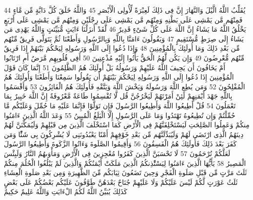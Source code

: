 \documentclass[20pt,a4paper]{article}
\begin{document}
{\tiny\colorbox{cl_aya}{44}} يُقَلِّبُ اللَّهُ الَّيْلَ وَالنَّهَارَ إِنَّ فِى ذَلِكَ لَعِبْرَةً لِّأُولِى الْأَبْصَرِ
{\tiny\colorbox{cl_aya}{45}} وَاللَّهُ خَلَقَ كُلَّ دَابَّةٍ مِّن مَّاءٍ فَمِنْهُم مَّن يَمْشِى عَلَى بَطْنِهِ وَمِنْهُم مَّن يَمْشِى عَلَى رِجْلَيْنِ وَمِنْهُم مَّن يَمْشِى عَلَى أَرْبَعٍ يَخْلُقُ اللَّهُ مَا يَشَاءُ إِنَّ اللَّهَ عَلَى كُلِّ شَىْءٍ قَدِيرٌ
{\tiny\colorbox{cl_aya}{46}} لَّقَدْ أَنزَلْنَا ءَايَتٍ مُّبَيِّنَتٍ وَاللَّهُ يَهْدِى مَن يَشَاءُ إِلَى صِرَطٍ مُّسْتَقِيمٍ
{\tiny\colorbox{cl_aya}{47}} وَيَقُولُونَ ءَامَنَّا بِاللَّهِ وَبِالرَّسُولِ وَأَطَعْنَا ثُمَّ يَتَوَلَّى فَرِيقٌ مِّنْهُم مِّن بَعْدِ ذَلِكَ وَمَا أُولَئِكَ بِالْمُؤْمِنِينَ
{\tiny\colorbox{cl_aya}{48}} وَإِذَا دُعُوا إِلَى اللَّهِ وَرَسُولِهِ لِيَحْكُمَ بَيْنَهُمْ إِذَا فَرِيقٌ مِّنْهُم مُّعْرِضُونَ
{\tiny\colorbox{cl_aya}{49}} وَإِن يَكُن لَّهُمُ الْحَقُّ يَأْتُوا إِلَيْهِ مُذْعِنِينَ
{\tiny\colorbox{cl_aya}{50}} أَفِى قُلُوبِهِم مَّرَضٌ أَمِ ارْتَابُوا أَمْ يَخَافُونَ أَن يَحِيفَ اللَّهُ عَلَيْهِمْ وَرَسُولُهُ بَلْ أُولَئِكَ هُمُ الظَّلِمُونَ
{\tiny\colorbox{cl_aya}{51}} إِنَّمَا كَانَ قَوْلَ الْمُؤْمِنِينَ إِذَا دُعُوا إِلَى اللَّهِ وَرَسُولِهِ لِيَحْكُمَ بَيْنَهُمْ أَن يَقُولُوا سَمِعْنَا وَأَطَعْنَا وَأُولَئِكَ هُمُ الْمُفْلِحُونَ
{\tiny\colorbox{cl_aya}{52}} وَمَن يُطِعِ اللَّهَ وَرَسُولَهُ وَيَخْشَ اللَّهَ وَيَتَّقْهِ فَأُولَئِكَ هُمُ الْفَائِزُونَ
{\tiny\colorbox{cl_aya}{53}} وَأَقْسَمُوا بِاللَّهِ جَهْدَ أَيْمَنِهِمْ لَئِنْ أَمَرْتَهُمْ لَيَخْرُجُنَّ قُل لَّا تُقْسِمُوا طَاعَةٌ مَّعْرُوفَةٌ إِنَّ اللَّهَ خَبِيرٌ بِمَا تَعْمَلُونَ
{\tiny\colorbox{cl_aya}{54}} قُلْ أَطِيعُوا اللَّهَ وَأَطِيعُوا الرَّسُولَ فَإِن تَوَلَّوْا فَإِنَّمَا عَلَيْهِ مَا حُمِّلَ وَعَلَيْكُم مَّا حُمِّلْتُمْ وَإِن تُطِيعُوهُ تَهْتَدُوا وَمَا عَلَى الرَّسُولِ إِلَّا الْبَلَغُ الْمُبِينُ
{\tiny\colorbox{cl_aya}{55}} وَعَدَ اللَّهُ الَّذِينَ ءَامَنُوا مِنكُمْ وَعَمِلُوا الصَّلِحَتِ لَيَسْتَخْلِفَنَّهُمْ فِى الْأَرْضِ كَمَا اسْتَخْلَفَ الَّذِينَ مِن قَبْلِهِمْ وَلَيُمَكِّنَنَّ لَهُمْ دِينَهُمُ الَّذِى ارْتَضَى لَهُمْ وَلَيُبَدِّلَنَّهُم مِّن بَعْدِ خَوْفِهِمْ أَمْنًا يَعْبُدُونَنِى لَا يُشْرِكُونَ بِى شَئًْا وَمَن كَفَرَ بَعْدَ ذَلِكَ فَأُولَئِكَ هُمُ الْفَسِقُونَ
{\tiny\colorbox{cl_aya}{56}} وَأَقِيمُوا الصَّلَوةَ وَءَاتُوا الزَّكَوةَ وَأَطِيعُوا الرَّسُولَ لَعَلَّكُمْ تُرْحَمُونَ
{\tiny\colorbox{cl_aya}{57}} لَا تَحْسَبَنَّ الَّذِينَ كَفَرُوا مُعْجِزِينَ فِى الْأَرْضِ وَمَأْوَىهُمُ النَّارُ وَلَبِئْسَ الْمَصِيرُ
{\tiny\colorbox{cl_aya}{58}} يَأَيُّهَا الَّذِينَ ءَامَنُوا لِيَسْتَْٔذِنكُمُ الَّذِينَ مَلَكَتْ أَيْمَنُكُمْ وَالَّذِينَ لَمْ يَبْلُغُوا الْحُلُمَ مِنكُمْ ثَلَثَ مَرَّتٍ مِّن قَبْلِ صَلَوةِ الْفَجْرِ وَحِينَ تَضَعُونَ ثِيَابَكُم مِّنَ الظَّهِيرَةِ وَمِن بَعْدِ صَلَوةِ الْعِشَاءِ ثَلَثُ عَوْرَتٍ لَّكُمْ لَيْسَ عَلَيْكُمْ وَلَا عَلَيْهِمْ جُنَاحٌ بَعْدَهُنَّ طَوَّفُونَ عَلَيْكُم بَعْضُكُمْ عَلَى بَعْضٍ كَذَلِكَ يُبَيِّنُ اللَّهُ لَكُمُ الْءَايَتِ وَاللَّهُ عَلِيمٌ حَكِيمٌ
\end{document}
